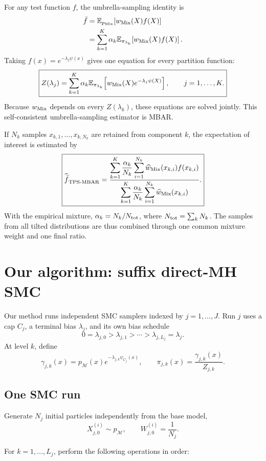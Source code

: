 \documentclass[11pt,a4paper]{article}
\newcommand{\pM}{p_{\mathcal M}}
\newcommand{\E}{\mathbb E}
\newcommand{\1}{\mathbb I}
\begin{document}
For any test function $f$, the umbrella-sampling identity is
\begin{align*}
\bar f
&=
\E_{p_{\rm Mix}}\!\left[w_{\rm Mix}(X)f(X)\right]\\
&=
\sum_{k=1}^{K}\alpha_k
\E_{\pi_{\lambda_k}}\!\left[
w_{\rm Mix}(X)f(X)
\right].
\end{align*}
Taking $f(x)=e^{-\lambda_j\psi(x)}$ gives one equation for every partition
function:
\[
\boxed{
Z(\lambda_j)
=
\sum_{k=1}^{K}\alpha_k
\E_{\pi_{\lambda_k}}\!\left[
w_{\rm Mix}(X)e^{-\lambda_j\psi(X)}
\right],
\qquad j=1,\ldots,K.}
\]
Because $w_{\rm Mix}$ depends on every $Z(\lambda_k)$, these equations are
solved jointly. This self-consistent umbrella-sampling estimator is MBAR.

If $N_k$ samples $x_{k,1},\ldots,x_{k,N_k}$ are retained from component $k$,
the expectation of interest is estimated by
\[
\boxed{
\widehat{\bar f}_{\rm TPS\text{-}MBAR}
=
\frac{
\displaystyle
\sum_{k=1}^{K}\frac{\alpha_k}{N_k}
\sum_{i=1}^{N_k}
\widehat w_{\rm Mix}(x_{k,i})f(x_{k,i})
}{
\displaystyle
\sum_{k=1}^{K}\frac{\alpha_k}{N_k}
\sum_{i=1}^{N_k}
\widehat w_{\rm Mix}(x_{k,i})
}.}
\]
With the empirical mixture, $\alpha_k=N_k/N_{\rm tot}$, where
$N_{\rm tot}=\sum_kN_k$. The samples from all tilted distributions are thus
combined through one common mixture weight and one final ratio.

\section{Our algorithm: suffix direct-MH SMC}

Our method runs independent SMC samplers indexed by $j=1,\ldots,J$. Run $j$
uses a cap $C_j$, a terminal bias $\lambda_j$, and its own bias schedule
\[
0=\lambda_{j,0}>\lambda_{j,1}>\cdots>
\lambda_{j,L_j}=\lambda_j.
\]
At level $k$, define
\[
\gamma_{j,k}(x)
=
\pM(x)e^{-\lambda_{j,k}\psi_{C_j}(x)},
\qquad
\pi_{j,k}(x)
=
\frac{\gamma_{j,k}(x)}{Z_{j,k}}.
\]

\subsection{One SMC run}

Generate $N_j$ initial particles independently from the base model,
\[
X_{j,0}^{(i)}\sim\pM,
\qquad
W_{j,0}^{(i)}=\frac{1}{N_j}.
\]

For $k=1,\ldots,L_j$, perform the following operations in order:
\end{document}
